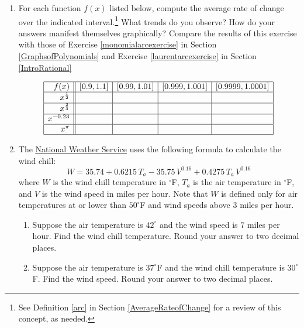\documentclass{ximera}
\begin{document}
\begin{enumerate}
\setcounter{enumi}{\value{HW}}

\item \label{powerarcexercise}For each function $f(x)$ listed below, compute the average rate of change over the indicated interval.\footnote{See Definition \ref{arc} in Section \ref{AverageRateofChange} for a review of this concept, as needed.}  What trends do you observe?  How do your answers manifest themselves graphically?  Compare the results of this exercise with those of Exercise \ref{monomialarcexercise} in Section \ref{GraphsofPolynomials} and Exercise \ref{laurentarcexercise} in Section \ref{IntroRational}

\[ \begin{array}{|r||c|c|c|c|}  \hline

 f(x) &  [0.9, 1.1] & [0.99, 1.01] &[0.999, 1.001] & [0.9999, 1.0001]  \\ \hline
 x^{\frac{1}{2}} &&&&  \\  \hline
 x^{\frac{2}{3}} &&&&  \\ \hline
 x^{-0.23} &&&&   \\  \hline
 x^{\pi}  &&&&   \\  \hline

\end{array} \]

\item \label{WindChillTemperature} The \href{http://www.nws.noaa.gov/om/windchill/windchillglossary.shtml}{\underline{National Weather Service}} uses the following formula to calculate the wind chill: \[ W = 35.74 + 0.6215 \, T_{a} - 35.75\, V^{0.16} + 0.4275 \, T_{a} \, V^{0.16}  \] where $W$ is the wind chill temperature in $^{\circ}$F, $T_{a}$ is the air temperature in $^{\circ}$F, and  $V$ is the wind speed in miles per hour.  Note that $W$ is defined only for air temperatures at or lower than $50^{\circ}$F and wind speeds above $3$ miles per hour.

\begin{enumerate}

\item  Suppose the air temperature is $42^{\circ}$ and the wind speed is $7$ miles per hour. Find the wind chill temperature.  Round your answer to two decimal places.

\item  Suppose the air temperature is $37^{\circ}$F and the wind chill temperature is $30^{\circ}$F.  Find the wind speed.  Round your answer to two decimal places. 


\end{enumerate}
\end{enumerate}
\end{document}
